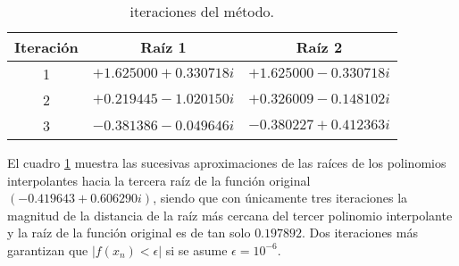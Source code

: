 \begin{table}[h!]
    \centering
    \caption{iteraciones del método.}
    \label{iterations_table}
    \begin{tabular}{c|c|c}
        \textbf{Iteración} & \textbf{Raíz 1} & \textbf{Raíz 2}\\
        \hline
        1 & $+1.625000+0.330718i$ & $+1.625000-0.330718i$\\
        2 & $+0.219445-1.020150i$ & $+0.326009-0.148102i$\\
        3 & $-0.381386-0.049646i$ & $-0.380227+0.412363i$\\
    \end{tabular}
\end{table}
El cuadro \ref{iterations_table} muestra las sucesivas aproximaciones de las raíces de los polinomios interpolantes
hacia la tercera raíz de la función original $(-0.419643+0.606290i)$, siendo que con únicamente tres iteraciones la
magnitud de la distancia de la raíz más cercana del tercer polinomio interpolante y la raíz de la función original es
de tan solo $0.197892$. Dos iteraciones más garantizan que $|f(x_n)<\epsilon|$ si se asume $\epsilon=10^{-6}$.
